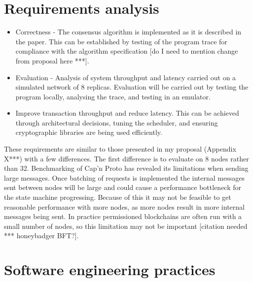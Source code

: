 \section{Requirements analysis}
\begin{itemize}
	\item Correctness - The consensus algorithm is implemented as it is described in the paper. This can be established by testing of the program trace for compliance with the algorithm specification [do I need to mention change from proposal here ***].
	\item Evaluation - Analysis of system throughput and latency carried out on a simulated network of 8 replicas. Evaluation will be carried out by testing the program locally, analysing the trace, and testing in an emulator.
	\item Improve transaction throughput and reduce latency. This can be achieved through architectural decisions, tuning the scheduler, and ensuring cryptographic libraries are being used efficiently.
\end{itemize}

These requirements are similar to those presented in my proposal (Appendix X***) with a few differences. The first difference is to evaluate on 8 nodes rather than 32. Benchmarking of Cap'n Proto has revealed its limitations when sending large messages. Once batching of requests is implemented the internal messages sent between nodes will be large and could cause a performance bottleneck for the state machine progressing. Because of this it may not be feasible to get reasonable performance with more nodes, as more nodes result in more internal messages being sent. In practice permissioned blockchains are often run with a small number of nodes, so this limitation may not be important [citation needed *** honeybadger BFT?].


\section{Software engineering practices}

